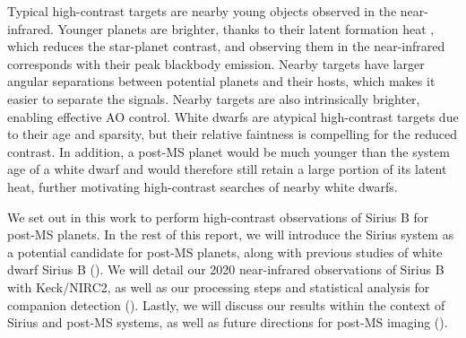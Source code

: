 \documentclass[twocolumn,linenumbers]{aastex631}
\begin{document}
Typical high-contrast targets are nearby young objects observed in the near-infrared. Younger planets are brighter, thanks to their latent formation heat \citep{fortneyGiantPlanetInterior2010}, which reduces the star-planet contrast, and observing them in the near-infrared corresponds with their peak blackbody emission. Nearby targets have larger angular separations between potential planets and their hosts, which makes it easier to separate the signals. Nearby targets are also intrinsically brighter, enabling effective AO control. White dwarfs are atypical high-contrast targets due to their age and sparsity, but their relative faintness is compelling for the reduced contrast. In addition, a post-MS planet would be much younger than the system age of a white dwarf and would therefore still retain a large portion of its latent heat, further motivating high-contrast searches of nearby white dwarfs.

We set out in this work to perform high-contrast observations of Sirius B for post-MS planets. In the rest of this report, we will introduce the Sirius system as a potential candidate for post-MS planets, along with previous studies of white dwarf Sirius B (). We will detail our 2020 near-infrared observations of Sirius B with Keck/NIRC2, as well as our processing steps and statistical analysis for companion detection (). Lastly, we will discuss our results within the context of Sirius and post-MS systems, as well as future directions for post-MS imaging ().



\end{document}
